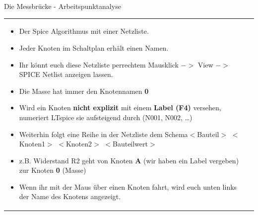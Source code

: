 \begin{frame}[t]{Die Messbrücke - Arbeitspunktanalyse}
\begin{spacing}{0.9}
\begin{tiny}
\begin{table}[h!]
\begin{tabular}{p{3cm} p{7cm}}
\begin{minipage}{.7\textwidth}
      \begin{itemize}
        \item Der Spice Algorithmus mit einer Netzliste. 
        \item Jeder Knoten im Schaltplan erhält einen Namen. 
        \item Ihr könnt euch diese Netzliste per\newline rechtem Mausklick $->$ View $->$ SPICE Netlist anzeigen lassen. 
        \item Die Masse hat immer den Knotennamen \textbf{0}
        \item Wird ein Knoten \textbf{nicht explizit} mit einem \textbf{Label (F4)} versehen, numeriert LTspice sie aufsteigend durch (N001, N002, \dots)
        \item Weiterhin folgt eine Reihe in der Netzliste dem Schema\newline $<$Bauteil$>$ $<$Knoten1$>$ $<$Knoten2$>$ $<$Bauteilwert$>$
        \item z.B. Widerstand R2 geht von Knoten \textbf{A} (wir haben ein Label vergeben) zur Knoten \textbf{0} (Masse)   
        \item Wenn ihr mit der Maus über einen Knoten fahrt, wird euch unten links der Name des Knotens angezeigt.
      \end{itemize}
      \end{minipage} 
      \\
      \end{tabular}
    \end{table}
  \end{tiny} \end{spacing}
  

     \end{frame}

